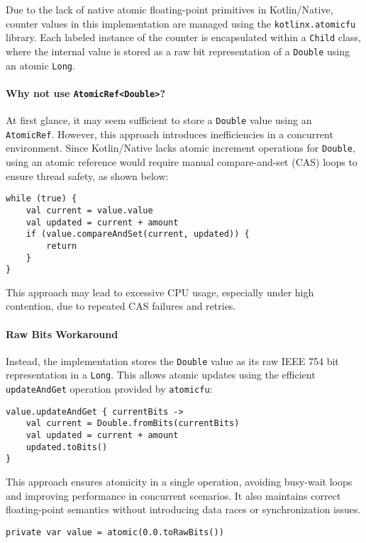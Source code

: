 Due to the lack of native atomic floating-point primitives in Kotlin/Native, counter values in this implementation are managed using the \texttt{kotlinx.atomicfu} library. Each labeled instance of the counter is encapsulated within a \texttt{Child} class, where the internal value is stored as a raw bit representation of a \texttt{Double} using an atomic \texttt{Long}.

\paragraph{Why not use \texttt{AtomicRef<Double>}?}  
At first glance, it may seem sufficient to store a \texttt{Double} value using an \texttt{AtomicRef}. However, this approach introduces inefficiencies in a concurrent environment. Since Kotlin/Native lacks atomic increment operations for \texttt{Double}, using an atomic reference would require manual compare-and-set (CAS) loops to ensure thread safety, as shown below:

\begin{verbatim}
while (true) {
    val current = value.value
    val updated = current + amount
    if (value.compareAndSet(current, updated)) {
        return
    }
}
\end{verbatim}

This approach may lead to excessive CPU usage, especially under high contention, due to repeated CAS failures and retries.

\paragraph{Raw Bits Workaround}

Instead, the implementation stores the \texttt{Double} value as its raw IEEE 754 bit representation in a \texttt{Long}. This allows atomic updates using the efficient \texttt{updateAndGet} operation provided by \texttt{atomicfu}:

\begin{verbatim}
value.updateAndGet { currentBits ->
    val current = Double.fromBits(currentBits)
    val updated = current + amount
    updated.toBits()
}
\end{verbatim}

This approach ensures atomicity in a single operation, avoiding busy-wait loops and improving performance in concurrent scenarios. It also maintains correct floating-point semantics without introducing data races or synchronization issues.


\begin{verbatim}
private var value = atomic(0.0.toRawBits())
\end{verbatim}



